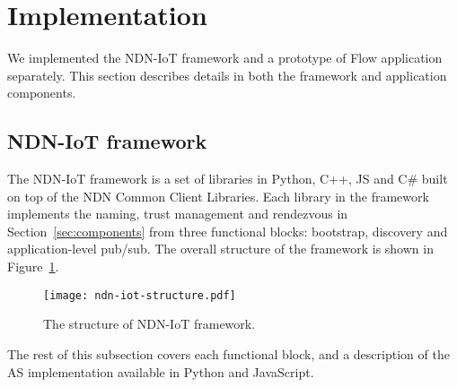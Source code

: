 \section{Implementation}
\label{sec:implementation}

We implemented the NDN-IoT framework and a prototype of Flow application separately.
This section describes details in both the framework and application components.

\subsection{NDN-IoT framework}

The NDN-IoT framework is a set of libraries in Python, C++, JS and C\# built on top of the NDN Common Client Libraries.
Each library in the framework implements the naming, trust management and rendezvous in Section~\ref{sec:components} from three functional blocks: bootstrap, discovery and application-level pub/sub.
The overall structure of the framework is shown in Figure~\ref{fig:ndn-iot-framework-structure}.

\begin{figure}[!t]
\centering
\texttt{[image: ndn-iot-structure.pdf]}
\caption{The structure of NDN-IoT framework.}
\label{fig:ndn-iot-framework-structure}
\end{figure}

The rest of this subsection covers each functional block, and a description of the AS implementation available in Python and JavaScript.

